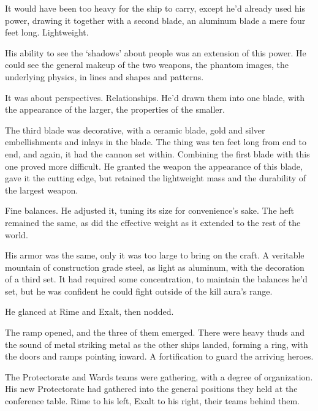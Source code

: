 It would have been too heavy for the ship to carry, except he'd already used his power, drawing it together with a second blade, an aluminum blade a mere four feet long.  Lightweight.



His ability to see the `shadows' about people was an extension of this power.  He could see the general makeup of the two weapons, the phantom images, the underlying physics, in lines and shapes and patterns.



It was about perspectives.  Relationships.  He'd drawn them into one blade, with the appearance of the larger, the properties of the smaller.



The third blade was decorative, with a ceramic blade, gold and silver embellishments and inlays in the blade.  The thing was ten feet long from end to end, and again, it had the cannon set within.   Combining the first blade with this one proved more difficult.  He granted the weapon the appearance of this blade, gave it the cutting edge, but retained the lightweight mass and the durability of the largest weapon.



Fine balances.  He adjusted it, tuning its size for convenience's sake.  The heft remained the same, as did the effective weight as it extended to the rest of the world.



His armor was the same, only it was too large to bring on the craft.  A veritable mountain of construction grade steel, as light as aluminum, with the decoration of a third set.  It had required some concentration, to maintain the balances he'd set, but he was confident he could fight outside of the kill aura's range.



He glanced at Rime and Exalt, then nodded.



The ramp opened, and the three of them emerged.  There were heavy thuds and the sound of metal striking metal as the other ships landed, forming a ring, with the doors and ramps pointing inward.  A fortification to guard the arriving heroes.



The Protectorate and Wards teams were gathering, with a degree of organization.  His new Protectorate had gathered into the general positions they held at the conference table.  Rime to his left, Exalt to his right, their teams behind them.



